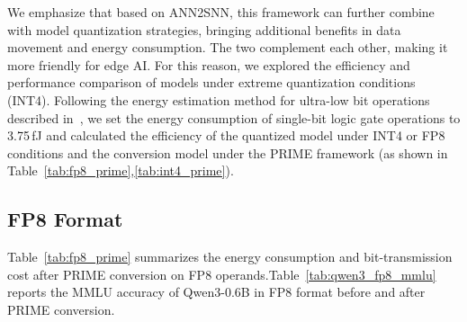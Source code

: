 We emphasize that based on ANN2SNN, this framework can further combine with model quantization strategies, bringing additional benefits in data movement and energy consumption. The two complement each other, making it more friendly for edge AI. For this reason, we explored the efficiency and performance comparison of models under extreme quantization conditions (INT4). Following the energy estimation method for ultra-low bit operations described in~\cite{liu2020birealnet,qin2020binary}, we set the energy consumption of single-bit logic gate operations to 3.75\,fJ and calculated the efficiency of the quantized model under INT4 or FP8 conditions and the conversion model under the PRIME framework (as shown in Table~\ref{tab:fp8_prime},\ref{tab:int4_prime}).

\subsection{FP8 Format}

Table~\ref{tab:fp8_prime} summarizes the energy consumption and bit-transmission cost after PRIME conversion on FP8 operands.Table~\ref{tab:qwen3_fp8_mmlu} reports the MMLU accuracy of Qwen3-0.6B in FP8 format before and after PRIME conversion.

\begin{table}[htbp]
  \centering
  \scriptsize
  \caption{Energy and bit-transmission cost of FP8 format after PRIME conversion.}
  \label{tab:fp8_prime}
\end{table}



\begin{table}[htbp]
  \centering
  \scriptsize
  \caption{MMLU accuracy of Qwen3-0.6B-FP8 before and after PRIME conversion.}
  \label{tab:qwen3_fp8_mmlu}
\end{table}

